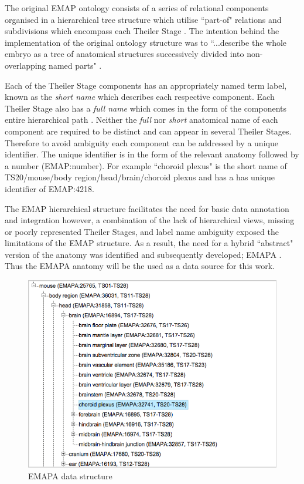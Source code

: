 The original EMAP ontology consists of a series of relational components organised in a hierarchical tree structure which utilise ``part-of" relations and subdivisions which encompass each Theiler Stage \cite{emap}. The intention behind the implementation of the original ontology structure was to ``...describe the whole embryo as a tree of anatomical structures successively divided into non-overlapping named parts" \cite{emap}.

Each of the Theiler Stage components has an appropriately named term label, known as the \textit{short name} which describes each respective component. Each Theiler Stage also has a \textit{full name} which comes in the form of the components entire hierarchical path \cite{emap}. Neither the \textit{full} nor \textit{short} anatomical name of each component are required to be distinct and can appear in several Theiler Stages. Therefore to avoid ambiguity each component can be addressed by a unique identifier. The unique identifier is in the form of the relevant anatomy followed by a number (EMAP:number). For example ``choroid plexus" is the short name of TS20/mouse/body region/head/brain/choroid plexus and has a has unique identifier of EMAP:4218.

The EMAP hierarchical structure facilitates the need for basic data annotation and integration however, a combination of the lack of hierarchical views, missing or poorly represented Theiler Stages, and label name ambiguity exposed the limitations of the EMAP structure. As a result, the need for a hybrid ``abstract" version of the anatomy was identified and subsequently developed; EMAPA \cite{emap}. Thus the EMAPA anatomy will be the used as a data source for this work.

\begin{figure}[H]\begin{center}\includegraphics[width=1\linewidth]{images/emapachoroidplexus}\caption{EMAPA data structure}\label{fig:emapa}\end{center}\end{figure}

